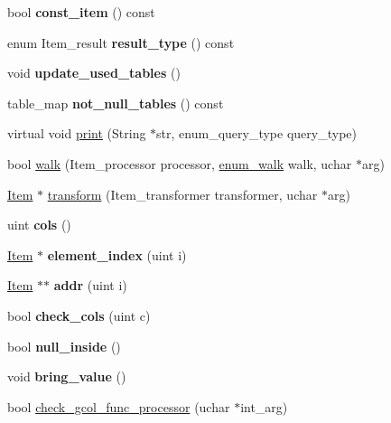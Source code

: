 \begin{DoxyCompactItemize}
\item 
\mbox{\label{classItem__row_ab44e088761c4650f28350f90d8190b1c}} 
bool {\bfseries const\+\_\+item} () const
\item 
\mbox{\label{classItem__row_a1d0b86aa24ebeb490fee49f5119ac719}} 
enum Item\+\_\+result {\bfseries result\+\_\+type} () const
\item 
\mbox{\label{classItem__row_aa8df148df1f2f27a0c643a133407f7ca}} 
void {\bfseries update\+\_\+used\+\_\+tables} ()
\item 
\mbox{\label{classItem__row_aa6556e2c79220e51a2bc88925d38aa84}} 
table\+\_\+map {\bfseries not\+\_\+null\+\_\+tables} () const
\item 
virtual void \mbox{\hyperlink{classItem__row_a9392533818e1f941a356ba46ba5c001c}{print}} (String $\ast$str, enum\+\_\+query\+\_\+type query\+\_\+type)
\item 
bool \mbox{\hyperlink{classItem__row_a7866a24ed779c242c6841735e7de6c04}{walk}} (Item\+\_\+processor processor, \mbox{\hyperlink{classItem_a4e68f315ba2a26543339e9f0efed3695}{enum\+\_\+walk}} walk, uchar $\ast$arg)
\item 
\mbox{\hyperlink{classItem}{Item}} $\ast$ \mbox{\hyperlink{classItem__row_a708898ec64fe61e228a0f345d1657afb}{transform}} (Item\+\_\+transformer transformer, uchar $\ast$arg)
\item 
\mbox{\label{classItem__row_a5dafd91cc8ba254513a40e8103f0838c}} 
uint {\bfseries cols} ()
\item 
\mbox{\label{classItem__row_ab24b50e5f5bbadb0ac3f8d7d788fc55a}} 
\mbox{\hyperlink{classItem}{Item}} $\ast$ {\bfseries element\+\_\+index} (uint i)
\item 
\mbox{\label{classItem__row_a701f84d217c0408cea36e8b61c5b056d}} 
\mbox{\hyperlink{classItem}{Item}} $\ast$$\ast$ {\bfseries addr} (uint i)
\item 
\mbox{\label{classItem__row_a1c94925f96d10c92f5f2754e68dc068d}} 
bool {\bfseries check\+\_\+cols} (uint c)
\item 
\mbox{\label{classItem__row_a0a29d92f66833e04cc4fb65ab8ec0f9c}} 
bool {\bfseries null\+\_\+inside} ()
\item 
\mbox{\label{classItem__row_ada49422265b95e8ff5ad81bcf88382ec}} 
void {\bfseries bring\+\_\+value} ()
\item 
bool \mbox{\hyperlink{classItem__row_abaff5b82ee17b24e4a5d24a3c71b29b4}{check\+\_\+gcol\+\_\+func\+\_\+processor}} (uchar $\ast$int\+\_\+arg)
\end{DoxyCompactItemize}
